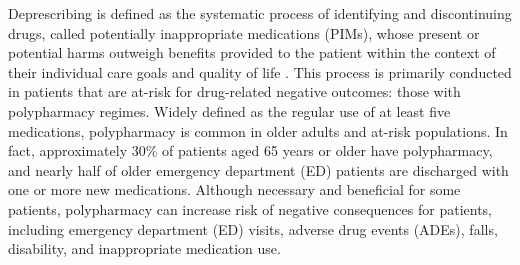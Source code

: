 Deprescribing is defined as the systematic process of identifying and discontinuing drugs, called potentially inappropriate medications (PIMs), whose present or potential harms outweigh benefits provided to the patient within the context of their individual care goals and quality of life \citep{hohlPolypharmacyAdverseDrugrelated2001a, scottReducingInappropriatePolypharmacy2015}. This process is primarily conducted in patients that are at-risk for drug-related negative outcomes: those with polypharmacy regimes. Widely defined as the regular use of at least five medications, polypharmacy is common in older adults and at-risk populations\citep{halli-tierneyPolypharmacyEvaluatingRisks2019}. In fact, approximately 30\% of patients aged 65 years or older have polypharmacy\citep{scottReducingInappropriatePolypharmacy2015}, and nearly half of older emergency department (ED) patients are discharged with one or more new medications\cite{skainsGeriatricEmergencyMedication2024}. Although necessary and beneficial for some patients, polypharmacy can increase risk of negative consequences for patients, including emergency department (ED) visits, adverse drug events (ADEs), falls, disability, and inappropriate medication use\cite{halli-tierneyPolypharmacyEvaluatingRisks2019}.

